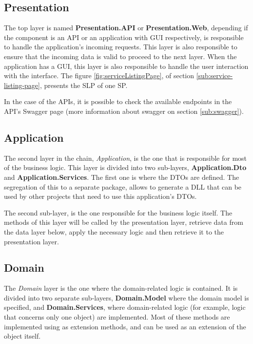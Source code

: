 \subsection{Presentation}
\label{sub:InternalStructure_Presentation}
The top layer is named \textbf{Presentation.API} or \textbf{Presentation.Web}, depending if the component is an \gls{API} or an application with \gls{GUI} respectively, is responsible to handle the application's incoming requests. This layer is also responsible to ensure that the incoming data is valid to proceed to the next layer. When the application has a \gls{GUI}, this layer is also responsible to handle the user interaction with the interface. The figure \ref{fig:serviceListingPage}, of section \ref{sub:service-listing-page}, presents the \gls{SLP} of one \gls{SP}.

\par 
In the case of the \glspl{API}, it is possible to check the available endpoints in the \gls{API}'s Swagger page (more information about swagger on section \ref{sub:swagger}).


\subsection{Application}
\label{sub:implementation-application}
The second layer in the chain, \textit{Application}, is the one that is responsible for most of the business logic. This layer is divided into two sub-layers, \textbf{Application.Dto} and \textbf{Application.Services}. The first one is where the \glspl{DTO} are defined. The segregation of this to a separate package, allows to generate a \gls{DLL} that can be used by other projects that need to use this application's \glspl{DTO}. 
\par
The second sub-layer, is the one responsible for the business logic itself. The methods of this layer will be called by the presentation layer, retrieve data from the data layer below, apply the necessary logic and then retrieve it to the presentation layer.

\subsection{Domain}
The \textit{Domain} layer is the one where the domain-related logic is contained. It is divided into two separate sub-layers, \textbf{Domain.Model} where the domain model is specified, and \textbf{Domain.Services}, where domain-related logic (for example, logic that concerns only one object) are implemented. Most of these methods are implemented using as extension methods, and can be used as an extension of the object itself.

